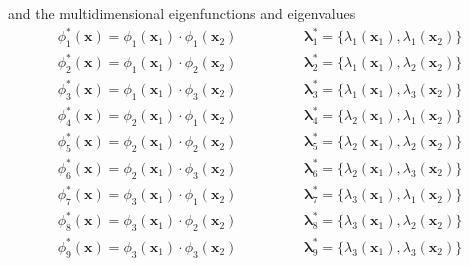 \documentclass[]{interact}
\theoremstyle{plain}%
\theoremstyle{definition}
\theoremstyle{remark}
\begin{document}
\noindent and the multidimensional eigenfunctions and eigenvalues
%
\begin{eqnarray}
\phi^{\ast}_1(\mathbf{x}) = \phi_{1}(\mathbf{x}_1) \cdot \phi_{1}(\mathbf{x}_2)  \hspace{2cm}
%
\boldsymbol{\lambda}^{\ast}_1 = \{\lambda_{1}(\mathbf{x}_1), \lambda_{1}(\mathbf{x}_2)\}  \nonumber \\
%
\phi^{\ast}_2(\mathbf{x}) = \phi_{1}(\mathbf{x}_1) \cdot \phi_{2}(\mathbf{x}_2)  \hspace{2cm}
%
\boldsymbol{\lambda}^{\ast}_2 = \{\lambda_{1}(\mathbf{x}_1), \lambda_{2}(\mathbf{x}_2)\} \nonumber \\
%
\phi^{\ast}_3(\mathbf{x}) = \phi_{1}(\mathbf{x}_1) \cdot \phi_{3}(\mathbf{x}_2) \hspace{2cm}
%
\boldsymbol{\lambda}^{\ast}_3 = \{\lambda_{1}(\mathbf{x}_1), \lambda_{3}(\mathbf{x}_2)\}  \nonumber \\
%
\phi^{\ast}_4(\mathbf{x}) = \phi_{2}(\mathbf{x}_1) \cdot \phi_{1}(\mathbf{x}_2)  \hspace{2cm}
%
\boldsymbol{\lambda}^{\ast}_4 = \{\lambda_{2}(\mathbf{x}_1), \lambda_{1}(\mathbf{x}_2)\}  \nonumber \\
%
\phi^{\ast}_5(\mathbf{x}) = \phi_{2}(\mathbf{x}_1) \cdot \phi_{2}(\mathbf{x}_2)  \hspace{2cm}
%
\boldsymbol{\lambda}^{\ast}_5 = \{\lambda_{2}(\mathbf{x}_1), \lambda_{2}(\mathbf{x}_2)\}  \nonumber \\
%
\phi^{\ast}_6(\mathbf{x}) = \phi_{2}(\mathbf{x}_1) \cdot \phi_{3}(\mathbf{x}_2)  \hspace{2cm}
%
\boldsymbol{\lambda}^{\ast}_6 = \{\lambda_{2}(\mathbf{x}_1), \lambda_{3}(\mathbf{x}_2)\}  \nonumber \\
%
\phi^{\ast}_7(\mathbf{x}) = \phi_{3}(\mathbf{x}_1) \cdot \phi_{1}(\mathbf{x}_2)  \hspace{2cm}
%
\boldsymbol{\lambda}^{\ast}_7 = \{\lambda_{3}(\mathbf{x}_1), \lambda_{1}(\mathbf{x}_2)\}  \nonumber \\
%
\phi^{\ast}_8(\mathbf{x}) = \phi_{3}(\mathbf{x}_1) \cdot \phi_{2}(\mathbf{x}_2)  \hspace{2cm}
%
\boldsymbol{\lambda}^{\ast}_8 = \{\lambda_{3}(\mathbf{x}_1), \lambda_{2}(\mathbf{x}_2)\}  \nonumber \\
%
\phi^{\ast}_9(\mathbf{x}) = \phi_{3}(\mathbf{x}_1) \cdot \phi_{3}(\mathbf{x}_2)  \hspace{2cm}
%
\boldsymbol{\lambda}^{\ast}_9 = \{\lambda_{3}(\mathbf{x}_1), \lambda_{3}(\mathbf{x}_2)\}  \nonumber
\end{eqnarray}
\end{document}
